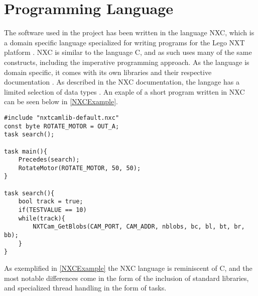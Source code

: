 \section{Programming Language}
The software used in the \name project has been written in the language NXC,
which is a domain specific language specialized for writing programs for the
Lego NXT platform \cite{NXCIntro}. NXC is similar to the language C, and as such
uses many of the same constructs, including the imperative programming approach. As the
language is domain specific, it comes with its own libraries and their
respective documentation \cite{NXCIntro}. As described in the NXC documentation,
the langage has a limited selection of data types \cite{NXCVariables}. An exaple
of a short program written in NXC can be seen below in \autoref{NXCExample}.\nl


\begin{minipage}[H]{\linewidth}
\begin{lstlisting}[caption = Exaple of a program written in the NXC language, label = NXCExample] 
#include "nxtcamlib-default.nxc"
const byte ROTATE_MOTOR = OUT_A;
task search();

task main(){
    Precedes(search);
    RotateMotor(ROTATE_MOTOR, 50, 50);
}

task search(){
	bool track = true;
	if(TESTVALUE == 10)
	while(track){
        NXTCam_GetBlobs(CAM_PORT, CAM_ADDR, nblobs, bc, bl, bt, br, bb);
	}
}
\end{lstlisting}
\end{minipage}

As exemplified in \autoref{NXCExample} the NXC language is reminiscent of C, and
the most notable differences come in the form of the inclusion of standard
libraries, and specialized thread handling in the form of tasks.
